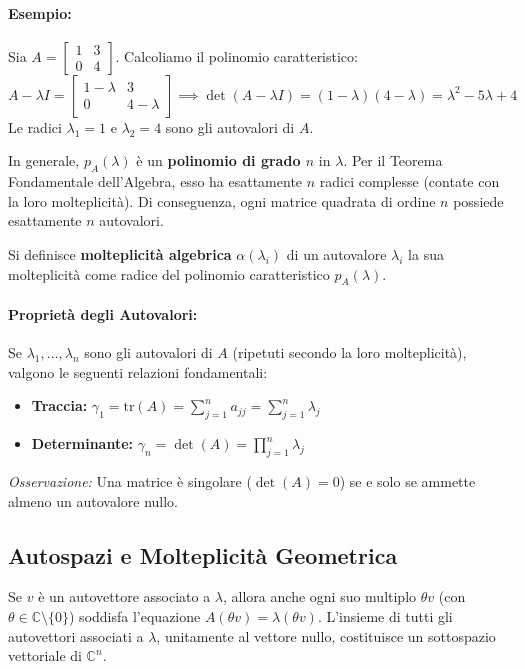 \documentclass[a4paper,12pt]{article}
\begin{document}
	\paragraph{Esempio:} 
	Sia $A = \begin{bmatrix} 1 & 3 \\ 0 & 4 \end{bmatrix}$. Calcoliamo il polinomio caratteristico:
	\[
	A - \lambda I = \begin{bmatrix} 1-\lambda & 3 \\ 0 & 4-\lambda \end{bmatrix} \implies \det(A - \lambda I) = (1-\lambda)(4-\lambda) = \lambda^2 - 5\lambda + 4
	\]
	Le radici $\lambda_1 = 1$ e $\lambda_2 = 4$ sono gli autovalori di $A$.
	
	\medskip
	\noindent In generale, $p_A(\lambda)$ è un \textbf{polinomio di grado $n$} in $\lambda$. Per il Teorema Fondamentale dell'Algebra, esso ha esattamente $n$ radici complesse (contate con la loro molteplicità). Di conseguenza, ogni matrice quadrata di ordine $n$ possiede esattamente $n$ autovalori.
	
	\begin{tcolorbox}[title=Definizione: Molteplicità Algebrica]
		Si definisce \textbf{molteplicità algebrica} $\alpha(\lambda_i)$ di un autovalore $\lambda_i$ la sua molteplicità come radice del polinomio caratteristico $p_A(\lambda)$.
	\end{tcolorbox}
	
	\paragraph{Proprietà degli Autovalori:} 
	Se $\lambda_1, \dots, \lambda_n$ sono gli autovalori di $A$ (ripetuti secondo la loro molteplicità), valgono le seguenti relazioni fondamentali:
	\begin{itemize}
		\item \textbf{Traccia:} $\gamma_1 = \text{tr}(A) = \sum_{j=1}^n a_{jj} = \sum_{j=1}^n \lambda_j$
		\item \textbf{Determinante:} $\gamma_n = \det(A) = \prod_{j=1}^n \lambda_j$
	\end{itemize}
	\textit{Osservazione:} Una matrice è singolare ($\det(A)=0$) se e solo se ammette almeno un autovalore nullo.
	
	\subsection{Autospazi e Molteplicità Geometrica}
	Se $v$ è un autovettore associato a $\lambda$, allora anche ogni suo multiplo $\theta v$ (con $\theta \in \mathbb{C} \setminus \{0\}$) soddisfa l'equazione $A(\theta v) = \lambda(\theta v)$. L'insieme di tutti gli autovettori associati a $\lambda$, unitamente al vettore nullo, costituisce un sottospazio vettoriale di $\mathbb{C}^n$.
	
\end{document}
